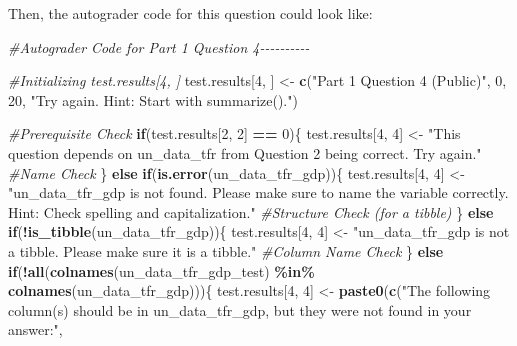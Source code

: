 \documentclass[
  12pt,
]{book}
\newenvironment{Shaded}{\begin{snugshade}}{\end{snugshade}}
\newcommand{\CommentTok}[1]{\textcolor[rgb]{0.56,0.35,0.01}{\textit{#1}}}
\newcommand{\ControlFlowTok}[1]{\textcolor[rgb]{0.13,0.29,0.53}{\textbf{#1}}}
\newcommand{\DecValTok}[1]{\textcolor[rgb]{0.00,0.00,0.81}{#1}}
\newcommand{\FunctionTok}[1]{\textcolor[rgb]{0.13,0.29,0.53}{\textbf{#1}}}
\newcommand{\NormalTok}[1]{#1}
\newcommand{\OtherTok}[1]{\textcolor[rgb]{0.56,0.35,0.01}{#1}}
\newcommand{\SpecialCharTok}[1]{\textcolor[rgb]{0.81,0.36,0.00}{\textbf{#1}}}
\newcommand{\StringTok}[1]{\textcolor[rgb]{0.31,0.60,0.02}{#1}}
\begin{document}
Then, the autograder code for this question could look like:

\begin{Shaded}
\begin{Highlighting}[]
\CommentTok{\#Autograder Code for Part 1 Question 4{-}{-}{-}{-}{-}{-}{-}{-}{-}{-}}

\CommentTok{\#Initializing \textasciigrave{}test.results[4, ]\textasciigrave{}}
\NormalTok{test.results[}\DecValTok{4}\NormalTok{, ] }\OtherTok{\textless{}{-}} \FunctionTok{c}\NormalTok{(}\StringTok{"Part 1 Question 4 (Public)"}\NormalTok{, }\DecValTok{0}\NormalTok{, }\DecValTok{20}\NormalTok{, }\StringTok{"Try again. Hint: Start with summarize()."}\NormalTok{)}
  
\CommentTok{\#Prerequisite Check}
\ControlFlowTok{if}\NormalTok{(test.results[}\DecValTok{2}\NormalTok{, }\DecValTok{2}\NormalTok{] }\SpecialCharTok{==} \DecValTok{0}\NormalTok{)\{}
\NormalTok{  test.results[}\DecValTok{4}\NormalTok{, }\DecValTok{4}\NormalTok{] }\OtherTok{\textless{}{-}} \StringTok{"This question depends on \textasciigrave{}un\_data\_tfr\textasciigrave{} from Question 2 being correct. Try again."}
\CommentTok{\#Name Check}
\NormalTok{\} }\ControlFlowTok{else} \ControlFlowTok{if}\NormalTok{(}\FunctionTok{is.error}\NormalTok{(un\_data\_tfr\_gdp))\{}
\NormalTok{  test.results[}\DecValTok{4}\NormalTok{, }\DecValTok{4}\NormalTok{] }\OtherTok{\textless{}{-}} \StringTok{"\textasciigrave{}un\_data\_tfr\_gdp\textasciigrave{} is not found. Please make sure to name the variable correctly. Hint: Check spelling and capitalization."}
\CommentTok{\#Structure Check (for a tibble)}
\NormalTok{\} }\ControlFlowTok{else} \ControlFlowTok{if}\NormalTok{(}\SpecialCharTok{!}\FunctionTok{is\_tibble}\NormalTok{(un\_data\_tfr\_gdp))\{}
\NormalTok{  test.results[}\DecValTok{4}\NormalTok{, }\DecValTok{4}\NormalTok{] }\OtherTok{\textless{}{-}} \StringTok{"\textasciigrave{}un\_data\_tfr\_gdp\textasciigrave{} is not a tibble. Please make sure it is a tibble."}
\CommentTok{\#Column Name Check}
\NormalTok{\} }\ControlFlowTok{else} \ControlFlowTok{if}\NormalTok{(}\SpecialCharTok{!}\FunctionTok{all}\NormalTok{(}\FunctionTok{colnames}\NormalTok{(un\_data\_tfr\_gdp\_test) }\SpecialCharTok{\%in\%} \FunctionTok{colnames}\NormalTok{(un\_data\_tfr\_gdp)))\{}
\NormalTok{  test.results[}\DecValTok{4}\NormalTok{, }\DecValTok{4}\NormalTok{] }\OtherTok{\textless{}{-}} \FunctionTok{paste0}\NormalTok{(}\FunctionTok{c}\NormalTok{(}\StringTok{"The following column(s) should be in un\_data\_tfr\_gdp, but they were not found in your answer:"}\NormalTok{,}

\end{Highlighting}
\end{Shaded}
\end{document}
